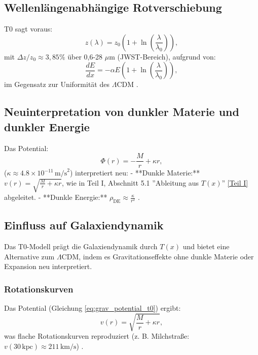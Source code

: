 \documentclass[12pt,a4paper]{article}
\newcommand{\Tfield}{T(x)}
\begin{document}
	\subsection{Wellenlängenabhängige Rotverschiebung}
	\label{subsec:wavelength_redshift}
	
	T0 sagt voraus:
	\begin{equation}
		z(\lambda) = z_0 \left(1 + \ln\left(\frac{\lambda}{\lambda_0}\right)\right),
		\label{eq:wavelength_redshift}
	\end{equation}
	mit \(\Delta z / z_0 \approx 3,85\%\) über 0,6-28 \(\mu\text{m}\) (JWST-Bereich), aufgrund von:
	\begin{equation}
		\frac{dE}{dx} = -\alpha E \left(1 + \ln\left(\frac{\lambda}{\lambda_0}\right)\right),
		\label{eq:wavelength_energy_loss}
	\end{equation}
	im Gegensatz zur Uniformität des \(\Lambda\)CDM \cite{pascher_params_2025}.
	
	\subsection{Neuinterpretation von dunkler Materie und dunkler Energie}
	\label{subsec:dark_reinterpretation}
	
	Das Potential:
	\begin{equation}
		\Phi(r) = -\frac{M}{r} + \kappa r,
		\label{eq:grav_potential_t0}
	\end{equation}
	(\(\kappa \approx 4.8 \times 10^{-11} \, \text{m/s}^2\)) interpretiert neu:
	- **Dunkle Materie:** \(v(r) = \sqrt{\frac{M}{r} + \kappa r}\), wie in Teil I, Abschnitt 5.1 ''Ableitung aus \(\Tfield\)'' \href{https://github.com/jpascher/T0-Time-Mass-Duality/tree/main/2/pdf/Deutsch/Bridging Quantum Mechanics and Relativity through Time-Mass Duality Part I Theoretical Foundations.pdf}{[Teil I]} abgeleitet.
	- **Dunkle Energie:** \(\rho_{\text{DE}} \approx \frac{\kappa}{r^2}\) \cite{pascher_galaxies_2025}.
	
	\subsection{Einfluss auf Galaxiendynamik}
	\label{subsec:galaxy_dynamics}
	
	Das T0-Modell prägt die Galaxiendynamik durch \(\Tfield\) und bietet eine Alternative zum \(\Lambda\)CDM, indem es Gravitationseffekte ohne dunkle Materie oder Expansion neu interpretiert.
	
	\subsubsection{Rotationskurven}
	Das Potential (Gleichung \ref{eq:grav_potential_t0}) ergibt:
	\begin{equation}
		v(r) = \sqrt{\frac{M}{r} + \kappa r},
		\label{eq:rotation_velocity}
	\end{equation}
	was flache Rotationskurven reproduziert (z. B. Milchstraße: \(v(30 \, \text{kpc}) \approx 211 \, \text{km/s}\)) \cite{pascher_galaxies_2025}.
	
\end{document}
